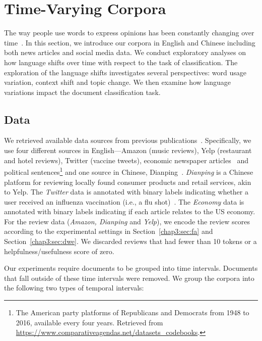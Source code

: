 \section{Time-Varying Corpora}
\label{chap3:sec:data}

The way people use words to express opinions has been constantly changing over time~\cite{mihalcea2012word, kulkarni2015statistically, hamilton2016diachronic}. In this section, we introduce our corpora in English and Chinese including both news articles and social media data. We conduct exploratory analyses on how language shifts over time with respect to the task of classification. The exploration of the language shifts investigates several perspectives: word usage variation, context shift and topic change. We then examine how language variations impact the document classification task.

\subsection{Data}
We retrieved available data sources from previous publications~\cite{zhang2014explicit, he2016ups, huang2018examining}. Specifically, we use four different sources in English---Amazon (music reviews), Yelp (restaurant and hotel reviews), Twitter (vaccine tweets), economic newspaper articles~\cite{figure_eight_2015} and political sentences\footnote{The American party platforms of Republicans and Democrats from 1948 to 2016, available every four years. Retrieved from \url{https://www.comparativeagendas.net/datasets_codebooks}.} and one source in Chinese, Dianping~\cite{meituan-dianping_2019}.
\textit{Dianping} is a Chinese platform for reviewing locally found consumer products and retail services, akin to Yelp.
The \textit{Twitter} data is annotated with binary labels indicating whether a user received an influenza vaccination (i.e., a flu shot)~\cite{huang2017examining}.
The \textit{Economy} data is annotated with binary labels indicating if each article relates to the US economy. 
For the review data (\textit{Amazon, Dianping} and \textit{Yelp}), we encode the review scores according to the experimental settings in Section~\ref{chap3:sec:fa} and Section~\ref{chap3:sec:dwe}. 
We discarded reviews that had fewer than 10 tokens or a helpfulness/usefulness score of zero. 

Our experiments require documents to be grouped into time intervals.
Documents that fall outside of these time intervals were removed. 
We group the corpora into the following two types of temporal intervals:

